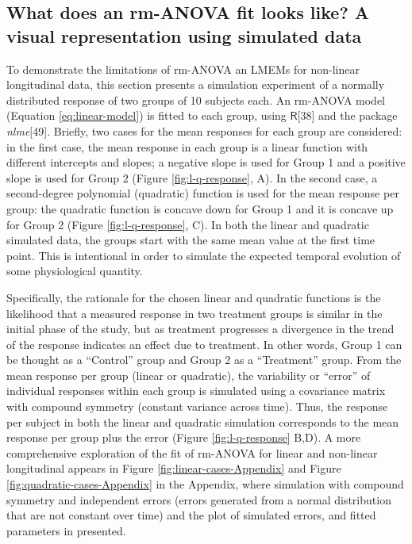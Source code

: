 \documentclass[
]{article}
\begin{document}
\hypertarget{simulation}{%
\subsection{What does an rm-ANOVA fit looks like? A visual representation using simulated data}\label{simulation}}

To demonstrate the limitations of rm-ANOVA an LMEMs for non-linear longitudinal data, this section presents a simulation experiment of a normally distributed response of two groups of 10 subjects each. An rm-ANOVA model (Equation \eqref{eq:linear-model}) is fitted to each group, using \(\textsf{R}\){[}38{]} and the package \emph{nlme}{[}49{]}.
Briefly, two cases for the mean responses for each group are considered: in the first case, the mean response in each group is a linear function with different intercepts and slopes; a negative slope is used for Group 1 and a positive slope is used for Group 2 (Figure \ref{fig:l-q-response}, A). In the second case, a second-degree polynomial (quadratic) function is used for the mean response per group: the quadratic function is concave down for Group 1 and it is concave up for Group 2 (Figure \ref{fig:l-q-response}, C). In both the linear and quadratic simulated data, the groups start with the same mean value at the first time point. This is intentional in order to simulate the expected temporal evolution of some physiological quantity.

Specifically, the rationale for the chosen linear and quadratic functions is the likelihood that a measured response in two treatment groups is similar in the initial phase of the study, but as treatment progresses a divergence in the trend of the response indicates an effect due to treatment. In other words, Group 1 can be thought as a ``Control'' group and Group 2 as a ``Treatment'' group. From the mean response per group (linear or quadratic), the variability or ``error'' of individual responses within each group is simulated using a covariance matrix with compound symmetry (constant variance across time). Thus, the response per subject in both the linear and quadratic simulation corresponds to the mean response per group plus the error (Figure \ref{fig:l-q-response} B,D). A more comprehensive exploration of the fit of rm-ANOVA for linear and non-linear longitudinal appears in Figure \ref{fig:linear-cases-Appendix} and Figure \ref{fig:quadratic-cases-Appendix} in the Appendix, where simulation with compound symmetry and independent errors (errors generated from a normal distribution that are not constant over time) and the plot of simulated errors, and fitted parameters in presented.
\end{document}
